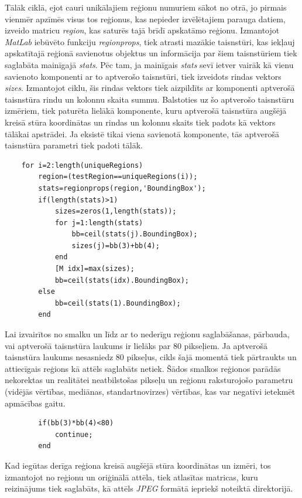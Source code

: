 \documentclass[12pt,paper=a4]{report}
\begin{document}
Tālāk ciklā, ejot cauri unikālajiem reģionu numuriem sākot no otrā, jo pirmais vienmēr apzīmēs visus tos reģionus, kas nepieder izvēlētajiem parauga datiem, izveido matricu \textit{region}, kas saturēs tajā brīdī apskatāmo reģionu. Izmantojot \textit{MatLab} iebūvēto funkciju \textit{regionprops}, tiek atrasti mazākie taisnstūri, kas iekļauj apskatītajā reģionā savienotus objektus un informācija par šiem taisnstūriem tiek saglabāta mainīgajā \textit{stats}. Pēc tam, ja mainīgais \textit{stats} sevī ietver vairāk kā vienu savienoto komponenti ar to aptverošo taisnstūri, tiek izveidots rindas vektors \textit{sizes}. Izmantojot ciklu, šis rindas vektors tiek aizpildīts ar komponenti aptverošā taisnstūra rindu un kolonnu skaita summu. Balstoties uz šo aptverošo taisnstūru izmēriem, tiek paturēta lielākā komponente, kuru aptverošā taisnstūra augšējā kreisā stūra koordinātas un rindas un kolonnu skaits tiek padots kā vektors tālākai apstrādei. Ja eksistē tikai viena savienotā komponente,  tās aptverošā taisnstūra parametri tiek padoti tālāk.
\begin{lstlisting}
    for i=2:length(uniqueRegions)
        region=(testRegion==uniqueRegions(i));
        stats=regionprops(region,'BoundingBox');
        if(length(stats)>1)
            sizes=zeros(1,length(stats));
            for j=1:length(stats)
                bb=ceil(stats(j).BoundingBox);
                sizes(j)=bb(3)+bb(4);
            end
            [M idx]=max(sizes);
            bb=ceil(stats(idx).BoundingBox);
        else
            bb=ceil(stats(1).BoundingBox);
        end
\end{lstlisting}\par
Lai izvairītos no smalku un līdz ar to nederīgu reģionu saglabāšanas, pārbauda, vai aptverošā taisnstūra laukums ir lielāks par 80 pikseļiem. Ja aptverošā taisnstūra laukums nesasniedz 80 pikseļus, cikls šajā momentā tiek pārtraukts un attiecīgais reģions kā attēls saglabāts netiek. Šādos smalkos reģionos parādās nekorektas un realitātei neatbilstošas pikseļu un reģionu raksturojošo parametru (vidējās vērtības, mediānas, standartnovirzes) vērtības, kas var negatīvi ietekmēt apmācības gaitu.
\begin{lstlisting}
        if(bb(3)*bb(4)<80)
            continue;
        end
\end{lstlisting}\par
Kad iegūtas derīga reģiona kreisā augšējā stūra koordinātas un izmēri, tos izmantojot no reģionu un oriģinālā attēla, tiek atlasītas matricas, kuru reizinājums tiek saglabāts, kā attēls \textit{JPEG} formātā iepriekš noteiktā direktorijā.
\end{document}
